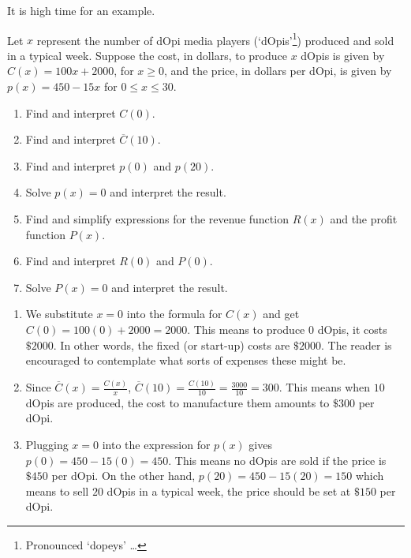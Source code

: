 \documentclass{ximera}
\begin{document}
It is high time for an example.

\begin{example} \label{costrevenueprofitex1}  Let $x$ represent the number of dOpi media players (`dOpis'\footnote{Pronounced `dopeys' \ldots}) produced and sold in a typical week.  Suppose the cost, in dollars, to produce $x$ dOpis  is given by   $C(x) = 100x + 2000$, for $x \geq 0$, and the price, in dollars per dOpi, is given by $p(x) = 450-15x$ for $0 \leq x \leq 30$.

\begin{enumerate}

\item  Find and interpret $C(0)$.
\item  Find and interpret $\overline{C}(10)$.

\item  Find and interpret $p(0)$ and $p(20)$.
\item  Solve $p(x) = 0$ and interpret the result.

\item  Find and simplify expressions for the revenue function $R(x)$ and the profit function $P(x)$.

\item  Find and interpret $R(0)$ and $P(0)$.
\item  Solve $P(x) = 0$ and interpret the result.

\end{enumerate}

\begin{explanation}

\begin{enumerate}

\item \label{fixedcostex} We substitute $x=0$ into the formula for $C(x)$ and get $C(0) = 100(0) + 2000 = 2000$.  This means to produce $0$ dOpis, it costs $\$2000$.  In other words, the fixed (or start-up) costs are $\$2000$. The reader is encouraged to contemplate what sorts of expenses these might be.

\item  Since $\overline{C}(x) = \frac{C(x)}{x}$, $\overline{C}(10) = \frac{C(10)}{10} = \frac{3000}{10} = 300$.  This means when $10$ dOpis are produced, the cost to manufacture them amounts to $\$ 300$ per dOpi.

\item Plugging $x=0$ into the expression for $p(x)$ gives $p(0) = 450 - 15(0) = 450$.  This means no dOpis are sold if the price is  $\$450$ per dOpi.  On the other hand, $p(20) = 450-15(20) = 150$ which means to sell $20$ dOpis in a typical week, the price should be set at $\$150$ per dOpi.


\end{enumerate}
\end{explanation}
\end{example}
\end{document}
